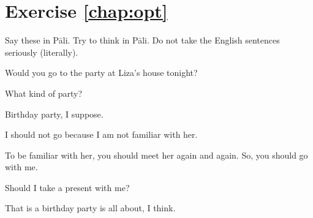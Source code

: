 \section*{Exercise \ref{chap:opt}}
Say these in P\=ali. Try to think in P\=ali. Do not take the English sentences seriously (literally).
\begin{compactenum}
\item Would you go to the party at Liza's house tonight?
\item What kind of party?
\item Birthday party, I suppose.
\item I should not go because I am not familiar with her.
\item To be familiar with her, you should meet her again and again. So, you should go with me.
\item Should I take a present with me?
\item That is a birthday party is all about, I think.
\end{compactenum}
